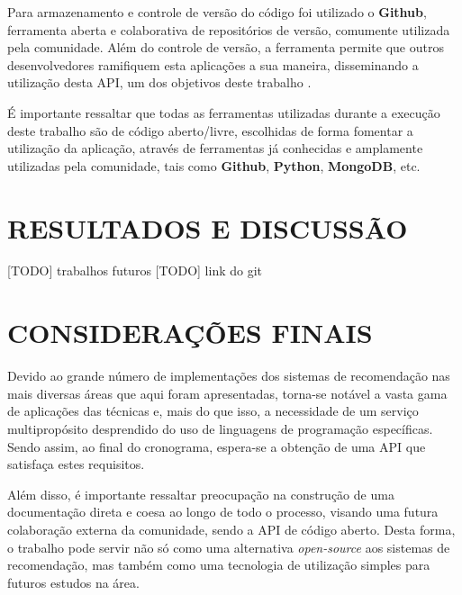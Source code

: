 \documentclass[12pt, openright, oneside, a4paper, brazil]{abntex2}
\begin{document}
Para armazenamento e controle de versão do código foi utilizado o \textbf{Github}, ferramenta aberta e colaborativa de repositórios de versão, comumente utilizada pela comunidade. Além do controle de versão, a ferramenta permite que outros desenvolvedores ramifiquem esta aplicações a sua maneira, disseminando a utilização desta API, um dos objetivos deste trabalho \cite{dabbish2012social}.

É importante ressaltar que todas as ferramentas utilizadas durante a execução deste trabalho são de código aberto/livre, escolhidas de forma fomentar a utilização da aplicação, através de ferramentas já conhecidas e amplamente utilizadas pela comunidade, tais como \textbf{Github}, \textbf{Python}, \textbf{MongoDB}, etc.

%
%

\chapter{RESULTADOS E DISCUSSÃO}

[TODO] trabalhos futuros
[TODO] link do git

\chapter{CONSIDERAÇÕES FINAIS}

Devido ao grande número de implementações dos sistemas de recomendação nas mais diversas áreas que aqui foram apresentadas, torna-se notável a vasta gama de aplicações das técnicas e, mais do que isso, a necessidade de um serviço multipropósito desprendido do uso de linguagens de programação específicas. Sendo assim, ao final do cronograma, espera-se a obtenção de uma API que satisfaça estes requisitos.

Além disso, é importante ressaltar preocupação na construção de uma documentação direta e coesa ao longo de todo o processo, visando uma futura colaboração externa da comunidade, sendo a API de código aberto. Desta forma, o trabalho pode servir não só como uma alternativa \textit{open-source} aos sistemas de recomendação, mas também como uma tecnologia de utilização simples para futuros estudos na área.

\postextual


\end{document}
